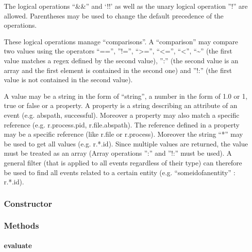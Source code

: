 \documentclass[letterpaper,10pt,english]{sphinxmanual}
\begin{document}
The logical operations ``\&\&'' and `!!' as well as the unary logical operation ''!'' are allowed. Parentheses may be
used to change the default precedence of the operations.

These logical operations manage ``comparisons''. A ``comparison'' may compare two values using the operators ``=='',
''!='', ``\textgreater{}='', ``\textless{}='', ``\textless{}'', ``\textasciitilde{}'' (the first value matches a regex defined by the second value), '':'' (the second value
is an array and the first element is contained in the second one) and ''!:'' (the first value is not contained
in the second value).

A value may be a string in the form of ``string'', a number in the form of 1.0 or 1, true or false or a property.
A property is a string describing an attribute of an event (e.g. abspath, successful). Moreover a property may
also match a specific reference (e.g. r.process.pid, r.file.abspath). The reference defined in a property may be
a specific reference (like r.file or r.process). Moreover the string ``*'' may be used to get all values
(e.g. r.*.id). Since multiple values are returned, the value  must be treated as an array (Array operations '':''
and ''!:'' must be used). A general filter (that is applied to all events regardless of their type) can therefore
be used to find all events related to a certain entity (e.g. ``someidofanentity'' : r.*.id).


\subsubsection{Constructor}
\label{ambrosia_web.filter.Filter:constructor}

\begin{fulllineitems}
\label{ambrosia_web.filter.Filter:ambrosia_web.filter.Filter}
\end{fulllineitems}



\subsubsection{Methods}
\label{ambrosia_web.filter.Filter:methods}

\paragraph{evaluate}
\label{ambrosia_web.filter.Filter:evaluate}
\end{document}
